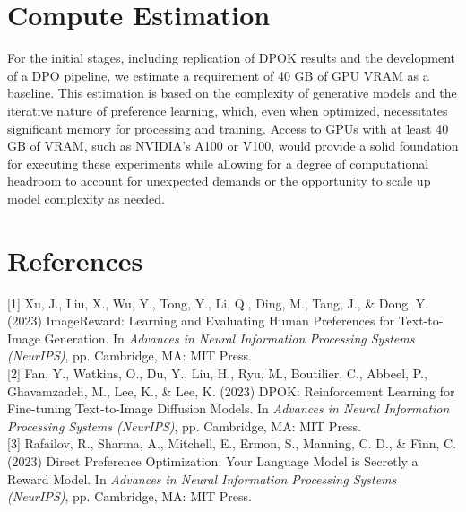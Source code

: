 \documentclass[12pt]{article}
\begin{document}
\section*{Compute Estimation}

For the initial stages, including replication of DPOK results and the development of a DPO pipeline, we estimate a requirement of 40 GB of GPU VRAM as a baseline. This estimation is based on the complexity of generative models and the iterative nature of preference learning, which, even when optimized, necessitates significant memory for processing and training. Access to GPUs with at least 40 GB of VRAM, such as NVIDIA's A100 or V100, would provide a solid foundation for executing these experiments while allowing for a degree of computational headroom to account for unexpected demands or the opportunity to scale up model complexity as needed.
\section*{References}
{
\small

[1] Xu, J., Liu, X., Wu, Y., Tong, Y., Li, Q., Ding, M., Tang, J., \& Dong, Y. (2023) ImageReward: Learning and Evaluating Human Preferences for Text-to-Image Generation. In {\it Advances in Neural Information Processing Systems (NeurIPS)}, pp. Cambridge, MA: MIT Press.\\

[2] Fan, Y., Watkins, O., Du, Y., Liu, H., Ryu, M., Boutilier, C., Abbeel, P., Ghavamzadeh, M., Lee, K., \& Lee, K. (2023) DPOK: Reinforcement Learning for Fine-tuning Text-to-Image Diffusion Models. In {\it Advances in Neural Information Processing Systems (NeurIPS)}, pp. Cambridge, MA: MIT Press.\\

[3] Rafailov, R., Sharma, A., Mitchell, E., Ermon, S., Manning, C. D., \& Finn, C. (2023) Direct Preference Optimization: Your Language Model is Secretly a Reward Model. In {\it Advances in Neural Information Processing Systems (NeurIPS)}, pp. Cambridge, MA: MIT Press.

}
\end{document}
